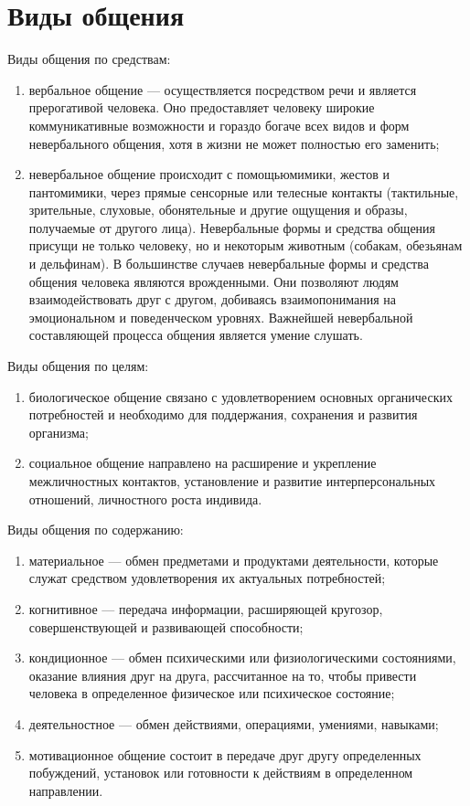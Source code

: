 \section{Виды общения}
Виды общения по средствам: \cite{13}
\begin{enumerate}
	\item вербальное общение — осуществляется посредством речи и является прерогативой человека. Оно предоставляет человеку широкие коммуникативные возможности и гораздо богаче всех видов и форм невербального общения, хотя в жизни не может полностью его заменить;
	\item невербальное общение происходит с помощьюмимики, жестов и пантомимики, через прямые сенсорные или телесные контакты (тактильные, зрительные, слуховые, обонятельные и другие ощущения и образы, получаемые от другого лица). Невербальные формы и средства общения присущи не только человеку, но и некоторым животным (собакам, обезьянам и дельфинам). В большинстве случаев невербальные формы и средства общения человека являются врожденными. Они позволяют людям взаимодействовать друг с другом, добиваясь взаимопонимания на эмоциональном и поведенческом уровнях. Важнейшей невербальной составляющей процесса общения является умение слушать.
\end{enumerate}
 
Виды общения по целям:
\begin{enumerate}
	\item биологическое общение связано с удовлетворением основных органических потребностей и необходимо для поддержания, сохранения и развития организма;
	\item социальное общение направлено на расширение и укрепление межличностных контактов, установление и развитие интерперсональных отношений, личностного роста индивида.
\end{enumerate}

Виды общения по содержанию:
\begin{enumerate}
	\item материальное — обмен предметами и продуктами деятельности, которые служат средством удовлетворения их актуальных потребностей;
	\item когнитивное — передача информации, расширяющей кругозор, совершенствующей и развивающей способности;
	\item кондиционное — обмен психическими или физиологическими состояниями, оказание влияния друг на друга, рассчитанное на то, чтобы привести человека в определенное физическое или психическое состояние;
	\item деятельностное — обмен действиями, операциями, умениями, навыками;
	\item мотивационное общение состоит в передаче друг другу определенных побуждений, установок или готовности к действиям в определенном направлении. 
\end{enumerate}

